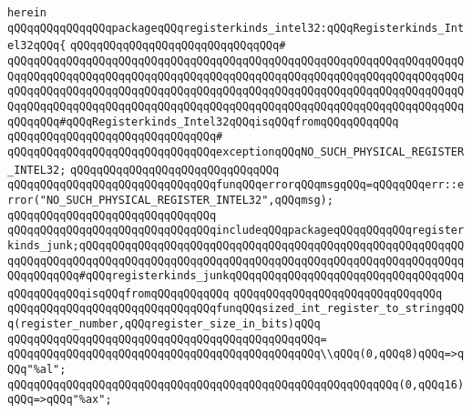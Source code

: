 \verb|herein|\newline
\newline
\verb|qQQqqQQqqQQqqQQqpackageqQQqregisterkinds_intel32:qQQqRegisterkinds_Intel32qQQq{|\newline
\verb|qQQqqQQqqQQqqQQqqQQqqQQqqQQqqQQq#|\newline
\verb|qQQqqQQqqQQqqQQqqQQqqQQqqQQqqQQqqQQqqQQqqQQqqQQqqQQqqQQqqQQqqQQqqQQqqQQqqQQqqQQqqQQqqQQqqQQqqQQqqQQqqQQqqQQqqQQqqQQqqQQqqQQqqQQqqQQqqQQqqQQqqQQqqQQqqQQqqQQqqQQqqQQqqQQqqQQqqQQqqQQqqQQqqQQqqQQqqQQqqQQqqQQqqQQqqQQqqQQqqQQqqQQqqQQqqQQqqQQqqQQqqQQqqQQqqQQqqQQqqQQqqQQqqQQqqQQqqQQqqQQqqQQqqQQq#qQQqRegisterkinds_Intel32qQQqisqQQqfromqQQqqQQqqQQq|\newline
\verb|qQQqqQQqqQQqqQQqqQQqqQQqqQQqqQQq#|\newline
\verb|qQQqqQQqqQQqqQQqqQQqqQQqqQQqqQQqexceptionqQQqNO_SUCH_PHYSICAL_REGISTER_INTEL32;|\newline
\verb|qQQqqQQqqQQqqQQqqQQqqQQqqQQqqQQq|\newline
\verb|qQQqqQQqqQQqqQQqqQQqqQQqqQQqqQQqfunqQQqerrorqQQqmsgqQQq=qQQqqQQqerr::error("NO_SUCH_PHYSICAL_REGISTER_INTEL32",qQQqmsg);|\newline
\verb|qQQqqQQqqQQqqQQqqQQqqQQqqQQqqQQq|\newline
\verb|qQQqqQQqqQQqqQQqqQQqqQQqqQQqqQQqincludeqQQqpackageqQQqqQQqqQQqregisterkinds_junk;qQQqqQQqqQQqqQQqqQQqqQQqqQQqqQQqqQQqqQQqqQQqqQQqqQQqqQQqqQQqqQQqqQQqqQQqqQQqqQQqqQQqqQQqqQQqqQQqqQQqqQQqqQQqqQQqqQQqqQQqqQQqqQQqqQQqqQQqqQQq#qQQqregisterkinds_junkqQQqqQQqqQQqqQQqqQQqqQQqqQQqqQQqqQQqqQQqqQQqqQQqisqQQqfromqQQqqQQqqQQq|\newline
\verb|qQQqqQQqqQQqqQQqqQQqqQQqqQQqqQQq|\newline
\newline
\verb|qQQqqQQqqQQqqQQqqQQqqQQqqQQqqQQqfunqQQqsized_int_register_to_stringqQQq(register_number,qQQqregister_size_in_bits)qQQq|\newline
\verb|qQQqqQQqqQQqqQQqqQQqqQQqqQQqqQQqqQQqqQQqqQQqqQQq=|\newline
\verb|qQQqqQQqqQQqqQQqqQQqqQQqqQQqqQQqqQQqqQQqqQQqqQQq\\qQQq(0,qQQq8)qQQq=>qQQq"%al";|\newline
\verb|qQQqqQQqqQQqqQQqqQQqqQQqqQQqqQQqqQQqqQQqqQQqqQQqqQQqqQQqqQQq(0,qQQq16)qQQq=>qQQq"%ax";|\newline
